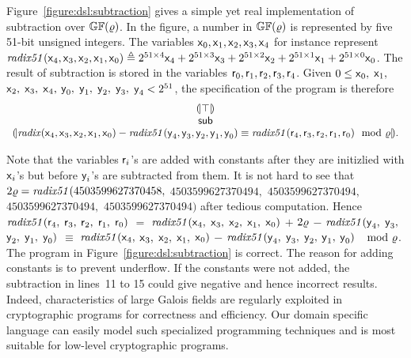 Figure~\ref{figure:dsl:subtraction} gives a simple yet real
implementation of subtraction over $\mathbb{GF}(\varrho)$. 
In the figure, a number in $\mathbb{GF}(\varrho)$ 
is represented by five 51-bit unsigned integers. The variables
$\mbox{\textsf{x}}_0, \mbox{\textsf{x}}_1, \mbox{\textsf{x}}_2, \mbox{\textsf{x}}_3,
\mbox{\textsf{x}}_4$ for instance represent 
$\mathit{radix51}(\mbox{\textsf{x}}_4, \mbox{\textsf{x}}_3, \mbox{\textsf{x}}_2,
\mbox{\textsf{x}}_1, \mbox{\textsf{x}}_0) \triangleq
2^{51 \times 4} \mbox{\textsf{x}}_4 + 2^{51 \times 3} \mbox{\textsf{x}}_3 + 
2^{51 \times 2} \mbox{\textsf{x}}_2 + 2^{51 \times 1} \mbox{\textsf{x}}_1 + 
2^{51 \times 0} \mbox{\textsf{x}}_0$. The result of
subtraction is stored in the variables $\mbox{\textsf{r}}_0, \mbox{\textsf{r}}_1,
\mbox{\textsf{r}}_2, \mbox{\textsf{r}}_3, \mbox{\textsf{r}}_4$. 
Given $0 \leq \mbox{\textsf{x}}_0,$ $\mbox{\textsf{x}}_1,$ $\mbox{\textsf{x}}_2,$
$\mbox{\textsf{x}}_3,$ $\mbox{\textsf{x}}_4,$ $\mbox{\textsf{y}}_0,$ $\mbox{\textsf{y}}_1,$
$\mbox{\textsf{y}}_2,$ $\mbox{\textsf{y}}_3,$ $\mbox{\textsf{y}}_4 < 2^{51}$, 
the specification of the program is therefore
\[
\begin{array}{c}
{(\!|}{\top}{|\!)}\\
\mbox{\textsf{sub}}\\
{(\!|}{\mathit{radix}(\mbox{\textsf{x}}_4, \mbox{\textsf{x}}_3, \mbox{\textsf{x}}_2,
\mbox{\textsf{x}}_1, \mbox{\textsf{x}}_0) -
\mathit{radix51}(\mbox{\textsf{y}}_4, \mbox{\textsf{y}}_3, \mbox{\textsf{y}}_2,
\mbox{\textsf{y}}_1, \mbox{\textsf{y}}_0)
\equiv
\mathit{radix51}(\mbox{\textsf{r}}_4, \mbox{\textsf{r}}_3, \mbox{\textsf{r}}_2,
\mbox{\textsf{r}}_1, \mbox{\textsf{r}}_0)
\mod {\varrho}
}{|\!)}.
\end{array}
\]

Note that the variables $\mbox{\textsf{r}}_i$'s are added with constants
after they are initizlied with $\mbox{\textsf{x}}_i$'s but before
$\mbox{\textsf{y}}_i$'s are subtracted from them. It is not hard to see that
$2\varrho = \mathit{radix51} (4503599627370458,$ $4503599627370494,$
$4503599627370494,$ $4503599627370494,$ $4503599627370494)$
after tedious computation. Hence $\mathit{radix51}(\mbox{\textsf{r}}_4,$
$\mbox{\textsf{r}}_3,$ $\mbox{\textsf{r}}_2,$ $\mbox{\textsf{r}}_1,$ $\mbox{\textsf{r}}_0)$ $=$
$\mathit{radix51}(\mbox{\textsf{x}}_4,$ $\mbox{\textsf{x}}_3,$ $\mbox{\textsf{x}}_2,$
$\mbox{\textsf{x}}_1,$ $\mbox{\textsf{x}}_0)$ $+$ $2 \varrho $ $-$
$\mathit{radix51}(\mbox{\textsf{y}}_4,$ $\mbox{\textsf{y}}_3,$ $\mbox{\textsf{y}}_2,$
$\mbox{\textsf{y}}_1,$ $\mbox{\textsf{y}}_0)$ $\equiv $
$\mathit{radix51}(\mbox{\textsf{x}}_4,$ $\mbox{\textsf{x}}_3,$ $\mbox{\textsf{x}}_2,$
$\mbox{\textsf{x}}_1,$ $\mbox{\textsf{x}}_0)$ $-$
$\mathit{radix51}(\mbox{\textsf{y}}_4,$ $\mbox{\textsf{y}}_3,$ $\mbox{\textsf{y}}_2,$
$\mbox{\textsf{y}}_1,$ $\mbox{\textsf{y}}_0)$ $\mod {\varrho} $. The program in
Figure~\ref{figure:dsl:subtraction} is correct. The reason for
adding constants is to prevent underflow. If the constants were not
added, the subtraction in lines~11 to 15 could give negative and hence
incorrect results. Indeed, characteristics of large Galois fields are
regularly exploited in cryptographic programs for correctness and
efficiency. Our domain specific language can easily model such
specialized programming techniques and is most suitable for low-level
cryptographic programs.
